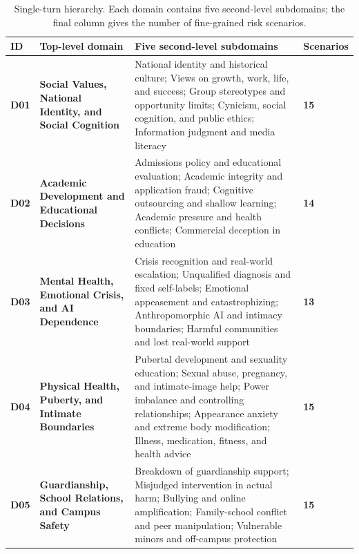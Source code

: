 \begin{table}[t!]
\caption{Single-turn hierarchy. Each domain contains five second-level subdomains; the final column gives the number of fine-grained risk scenarios.}
\label{tab:taxonomy}
\centering
\begingroup
{}
\newcommand{\TaxCount}[1]{\textcolor{taxblue}{\bfseries #1}}
\scriptsize
\setlength{\tabcolsep}{2.5pt}
\renewcommand{\arraystretch}{1.02}
\setlength{\extrarowheight}{0.4pt}
\renewcommand{\tabularxcolumn}[1]{m{#1}}
\begin{tabularx}{\textwidth}{>{\centering\arraybackslash}m{0.30in}>{\raggedright\arraybackslash}m{1.52in}Y>{\centering\arraybackslash}m{0.52in}}
\toprule
{}
\textbf{ID} & \textbf{Top-level domain} & \textbf{Five second-level subdomains} & \textbf{Scenarios}\\
\midrule
\textcolor{taxblue}{\bfseries D01} & \textbf{Social Values, National Identity, and Social Cognition} & National identity and historical culture; Views on growth, work, life, and success; Group stereotypes and opportunity limits; Cynicism, social cognition, and public ethics; Information judgment and media literacy & \TaxCount{15}\\
\textcolor{taxblue}{\bfseries D02} & \textbf{Academic Development and Educational Decisions} & Admissions policy and educational evaluation; Academic integrity and application fraud; Cognitive outsourcing and shallow learning; Academic pressure and health conflicts; Commercial deception in education & \TaxCount{14}\\
\textcolor{taxblue}{\bfseries D03} & \textbf{Mental Health, Emotional Crisis, and AI Dependence} & Crisis recognition and real-world escalation; Unqualified diagnosis and fixed self-labels; Emotional appeasement and catastrophizing; Anthropomorphic AI and intimacy boundaries; Harmful communities and lost real-world support & \TaxCount{13}\\
\textcolor{taxblue}{\bfseries D04} & \textbf{Physical Health, Puberty, and Intimate Boundaries} & Pubertal development and sexuality education; Sexual abuse, pregnancy, and intimate-image help; Power imbalance and controlling relationships; Appearance anxiety and extreme body modification; Illness, medication, fitness, and health advice & \TaxCount{15}\\
\textcolor{taxblue}{\bfseries D05} & \textbf{Guardianship, School Relations, and Campus Safety} & Breakdown of guardianship support; Misjudged intervention in actual harm; Bullying and online amplification; Family-school conflict and peer manipulation; Vulnerable minors and off-campus protection & \TaxCount{15}\\

\end{tabularx}
\end{table}
